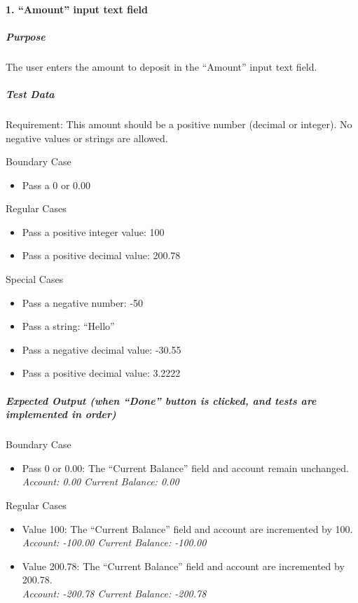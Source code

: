 \documentclass[12pt]{article}
\begin{document}
\paragraph{1. “Amount” input text field}
\subparagraph{Purpose} The user enters the amount to deposit in the “Amount” input text field.

\subparagraph{Test Data} Requirement: This amount should be a positive number (decimal or integer). No negative values or strings are allowed.

Boundary Case
\begin{itemize}
  \item Pass a 0 or 0.00
\end{itemize}

Regular Cases
\begin{itemize}
  \item Pass a positive integer value: 100
  \item Pass a positive decimal value: 200.78
\end{itemize}

Special Cases
\begin{itemize}
  \item Pass a negative number: -50
  \item Pass a string: “Hello”
  \item Pass a negative decimal value: -30.55
  \item Pass a positive decimal value: 3.2222
\end{itemize}

\subparagraph{Expected Output (when “Done” button is clicked, and tests are implemented in order)}

Boundary Case
\begin{itemize}
  \item Pass 0 or 0.00: The “Current Balance” field and account remain unchanged.\\
{\it Account: 0.00 Current Balance: 0.00}
\end{itemize}

Regular Cases
\begin{itemize}
  \item Value 100: The “Current Balance” field and account are incremented by 100. 
{\it Account: -100.00 Current Balance: -100.00}
  \item Value 200.78: The “Current Balance” field and account are incremented by 200.78.\\
{\it Account: -200.78 Current Balance: -200.78}
\end{itemize}
\end{document}

